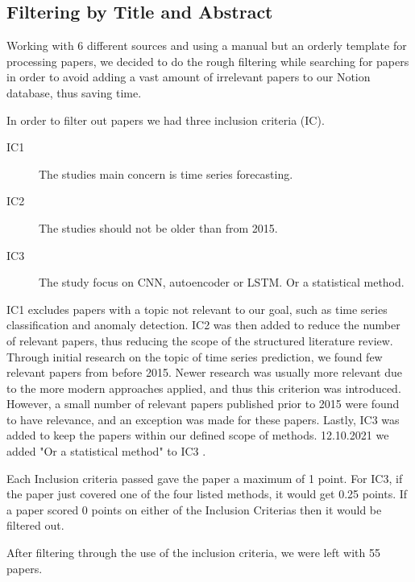 \subsection{Filtering by Title and Abstract}
Working with 6 different sources and using a manual but an orderly template for processing papers,
we decided to do the rough filtering while searching for papers in order to avoid adding a vast amount of irrelevant
papers to our Notion database, thus saving time.

In order to filter out papers we had three inclusion criteria (IC).
\begin{description}
    \item[IC1] The studies main concern is time series forecasting.
    \item[IC2] The studies should not be older than from 2015.
    \item[IC3] The study focus on CNN, autoencoder or LSTM. Or a statistical method.
\end{description}
IC1 excludes papers with a topic not relevant to our goal, such as time series classification and anomaly detection.
IC2 was then added to reduce the number of relevant papers, thus reducing the scope of the structured literature review.
Through initial research on the topic of time series prediction, we found few relevant papers from before 2015.
Newer research was usually more relevant due to the more modern approaches applied, and thus this criterion was introduced.
However, a small number of relevant papers published prior to 2015 were found to have relevance, and an exception was made for these papers.
Lastly, IC3 was added to keep the papers within our defined scope of methods. 12.10.2021 we added "Or a statistical method"
to IC3 \citep{decisionmatrix}.

Each Inclusion criteria passed gave the paper a maximum of 1 point. For IC3, if the paper just covered one of the 
four listed methods, it would get 0.25 points. If a paper scored 0 points on either of the Inclusion Criterias then
it would be filtered out.

After filtering through the use of the inclusion criteria, we were left with 55 papers.

